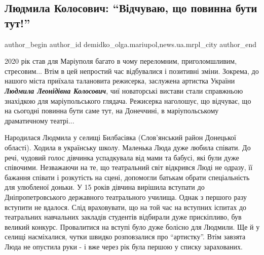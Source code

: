  
 
 
 
 
 
\subsection{Людмила Колосович: \enquote{Відчуваю, що повинна бути тут!}}
\label{sec:23_12_2020.stz.news.ua.mrpl_city.1.ljudmyla_kolosovych}
 
\ifcmt
 author_begin
   author_id demidko_olga.mariupol,news.ua.mrpl_city
 author_end
\fi


2020 рік став для Маріуполя багато в чому переломним, приголомшливим,
стресовим... Втім в цей непростий час відбувалися і позитивні зміни. Зокрема, до
нашого міста приїхала талановита режисерка, заслужена артистка України \emph{\textbf{Людмила
Леонідівна Колосович}}, чиї новаторські вистави стали справжньою знахідкою для
маріупольського глядача. Режисерка наголошує, що відчуває, що на сьогодні
повинна бути саме тут, на Донеччині, в маріупольському драматичному театрі...


Народилася Людмила у селищі Билбасівка (Слов'янський район Донецької області).
Ходила в українську школу. Маленька Люда дуже любила співати. До речі, чудовий
голос дівчинка успадкувала від мами та бабусі, які були дуже співочими.
Незважаючи на те, що театральний світ відкрився Люді не одразу, її бажання
співати і розкутість на сцені, допомогли батькам обрати спеціальність для
улюбленої доньки. У 15 років дівчина вирішила вступати до Дніпропетровського
державного театрального училища. Однак з першого разу вступити не вдалося. Слід
враховувати, що на той час на вступних іспитах до театральних навчальних
закладів студентів відбирали дуже прискіпливо, був великий конкурс. Провалитися
на вступі було дуже болісно для Людмили. Ще й у селищі насміхалися, чутки
швидко розповзалися про \enquote{артистку}. Втім завзята Люда не опустила руки - і вже
через рік була першою у списку зарахованих. 

